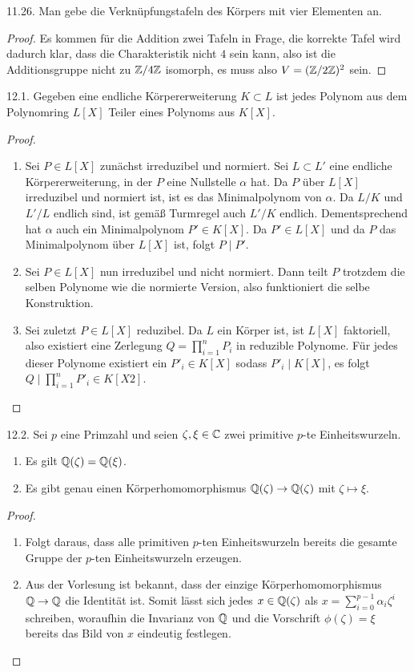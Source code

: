 \documentclass{article}
\newcommand{\ex}[1]{\tit{Übung} #1.}
\begin{document}
		\newpar
		\ex{11.26} Man gebe die Verknüpfungstafeln des Körpers mit vier Elementen an.
		\begin{proof}
			Es kommen für die Addition zwei Tafeln in Frage, die korrekte Tafel wird dadurch klar, dass die Charakteristik nicht $4$ sein kann, also ist die Additionsgruppe nicht zu $\mathbb{Z}/4\mathbb{Z}$ isomorph, es muss also $V = (\mathbb{Z}/2\mathbb{Z})^2$ sein.
		\end{proof}
		\newpar
		\ex{12.1} Gegeben eine endliche Körpererweiterung $K \subset L$ ist jedes Polynom aus dem Polynomring $L[X]$ Teiler eines Polynoms aus $K[X]$.
		\begin{proof}
			\begin{enumerate}
				\item Sei $P \in L[X]$ zunächst irreduzibel und normiert. Sei $L \subset L'$ eine endliche Körpererweiterung, in der $P$ eine Nullstelle $\alpha$ hat. Da $P$ über $L[X]$ irreduzibel und normiert ist, ist es das Minimalpolynom von $\alpha$. Da $L/K$ und $L'/L$ endlich sind, ist gemäß Turmregel auch $L'/K$ endlich. Dementsprechend hat $\alpha$ auch ein Minimalpolynom $P' \in K[X]$. Da $P' \in L[X]$ und da $P$ das Minimalpolynom über $L[X]$ ist, folgt $P \mid P'$.
				\item Sei $P \in L[X]$ nun irreduzibel und nicht normiert. Dann teilt $P$ trotzdem die selben Polynome wie die normierte Version, also funktioniert die selbe Konstruktion.
				\item Sei zuletzt $P \in L[X]$ reduzibel. Da $L$ ein Körper ist, ist $L[X]$ faktoriell, also existiert eine Zerlegung $Q = \prod_{i = 1}^n P_i$ in reduzible Polynome. Für jedes dieser Polynome existiert ein $P'_i \in K[X]$ sodass $P'_i \mid K[X]$, es folgt $Q \mid \prod_{i = 1}^n P'_i \in K[X2]$.
			\end{enumerate}
		\end{proof}
		\newpar
		\ex{12.2} Sei $p$ eine Primzahl und seien $\zeta, \xi \in \mathbb{C}$ zwei primitive $p$-te Einheitswurzeln.
		\begin{enumerate}
			\item Es gilt $\mathbb{Q}(\zeta) = \mathbb{Q}(\xi)$.
			\item Es gibt genau einen Körperhomomorphismus $\mathbb{Q}(\zeta) \to \mathbb{Q}(\zeta)$ mit $\zeta \mapsto \xi$.
		\end{enumerate}
		\begin{proof}
			\begin{enumerate}
				\item Folgt daraus, dass alle primitiven $p$-ten Einheitswurzeln bereits die gesamte Gruppe der $p$-ten Einheitswurzeln erzeugen.
				\item Aus der Vorlesung ist bekannt, dass der einzige Körperhomomorphismus $\mathbb{Q} \to \mathbb{Q}$ die Identität ist. Somit lässt sich jedes $x \in \mathbb{Q}(\zeta)$ als $x = \sum_{i = 0}^{p-1} \alpha_i \zeta^i$ schreiben, woraufhin die Invarianz von $\mathbb{Q}$ und die Vorschrift $\phi(\zeta) = \xi$ bereits das Bild von $x$ eindeutig festlegen.
			\end{enumerate}
		\end{proof}
\end{document}
